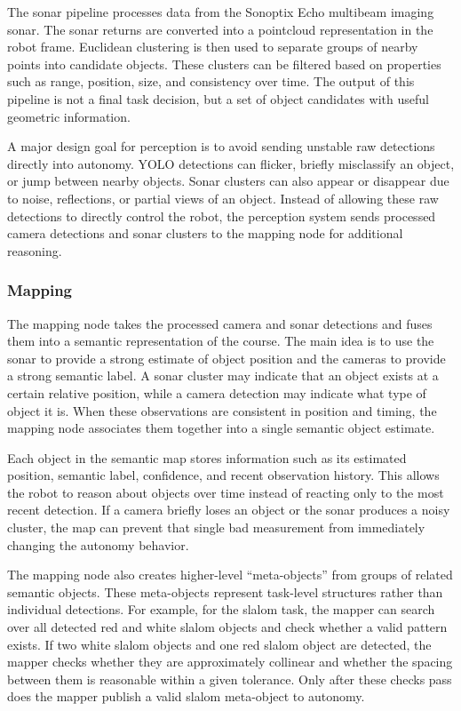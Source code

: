 \documentclass[conference]{IEEEtran}
\begin{document}
The sonar pipeline processes data from the Sonoptix Echo multibeam imaging sonar. The sonar returns are converted into a pointcloud representation in the robot frame. Euclidean clustering is then used to separate groups of nearby points into candidate objects. These clusters can be filtered based on properties such as range, position, size, and consistency over time. The output of this pipeline is not a final task decision, but a set of object candidates with useful geometric information.

A major design goal for perception is to avoid sending unstable raw detections directly into autonomy. YOLO detections can flicker, briefly misclassify an object, or jump between nearby objects. Sonar clusters can also appear or disappear due to noise, reflections, or partial views of an object. Instead of allowing these raw detections to directly control the robot, the perception system sends processed camera detections and sonar clusters to the mapping node for additional reasoning.

\subsubsection{Mapping}
The mapping node takes the processed camera and sonar detections and fuses them into a semantic representation of the course. The main idea is to use the sonar to provide a strong estimate of object position and the cameras to provide a strong semantic label. A sonar cluster may indicate that an object exists at a certain relative position, while a camera detection may indicate what type of object it is. When these observations are consistent in position and timing, the mapping node associates them together into a single semantic object estimate.

Each object in the semantic map stores information such as its estimated position, semantic label, confidence, and recent observation history. This allows the robot to reason about objects over time instead of reacting only to the most recent detection. If a camera briefly loses an object or the sonar produces a noisy cluster, the map can prevent that single bad measurement from immediately changing the autonomy behavior.

The mapping node also creates higher-level ``meta-objects'' from groups of related semantic objects. These meta-objects represent task-level structures rather than individual detections. For example, for the slalom task, the mapper can search over all detected red and white slalom objects and check whether a valid pattern exists. If two white slalom objects and one red slalom object are detected, the mapper checks whether they are approximately collinear and whether the spacing between them is reasonable within a given tolerance. Only after these checks pass does the mapper publish a valid slalom meta-object to autonomy.
\end{document}
